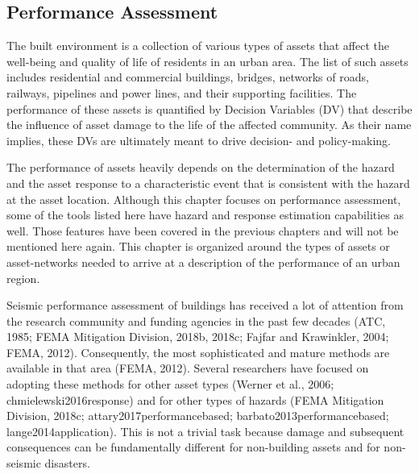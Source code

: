 
\begin{partbacktext}
\part{Performance Assessment}\label{part:Performance}

The built environment is a collection of various types of assets that affect the well-being and quality of life of residents in an urban area. The list of such assets includes residential and commercial buildings, bridges, networks of roads, railways, pipelines and power lines, and their supporting facilities. The performance of these assets is quantified by Decision Variables (DV) that describe the influence of asset damage to the life of the affected community. As their name implies, these DVs are ultimately meant to drive decision- and policy-making.

The performance of assets heavily depends on the determination of the hazard and the asset response to a characteristic event that is consistent with the hazard at the asset location. Although this chapter focuses on performance assessment, some of the tools listed here have hazard and response estimation capabilities as well. Those features have been covered in the previous chapters and will not be mentioned here again. This chapter is organized around the types of assets or asset-networks needed to arrive at a description of the performance of an urban region. 

Seismic performance assessment of buildings has received a lot of attention from the research community and funding agencies in the past few decades (ATC, 1985; FEMA Mitigation Division, 2018b, 2018c; Fajfar and Krawinkler, 2004; FEMA, 2012). Consequently, the most sophisticated and mature methods are available in that area (FEMA, 2012). Several researchers have focused on adopting these methods for other asset types (Werner et al., 2006; chmielewski2016response) and for other types of hazards (FEMA Mitigation Division, 2018c; attary2017performancebased; barbato2013performancebased; lange2014application). This is not a trivial task because damage and subsequent consequences can be fundamentally different for non-building assets and for non-seismic disasters.  

\end{partbacktext}
